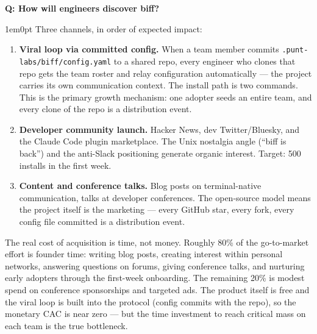 \documentclass[11pt,letterpaper]{article}
\newcounter{faqnum}
\newenvironment{faqpair}[1]{%
  \needspace{4\baselineskip}%
  \vspace{0.5em}%
  \refstepcounter{faqnum}%
  \noindent\textbf{\color{SectionBlue}Q\thefaqnum: #1}\par\nopagebreak[4]%
  \vspace{0.2em}%
  \begin{adjustwidth}{1em}{0pt}%
  \setlength{\parindent}{0pt}%
}{%
  \end{adjustwidth}%
  \vspace{0.5em}%
}
\begin{document}
\begin{faqpair}{How will engineers discover biff?}\label{faq:discovery}
  Three channels, in order of expected impact:

  \begin{enumerate}[leftmargin=1.5em]
    \item \textbf{Viral loop via committed config.} When a team member
    commits \texttt{.punt-labs/biff/config.yaml} to a shared repo, every engineer who
    clones that repo gets the team roster and relay configuration
    automatically --- the project carries its own communication context.
    The install path is two commands. This
    is the primary growth mechanism: one adopter seeds an entire team,
    and every clone of the repo is a distribution event.

    \item \textbf{Developer community launch.} Hacker News, dev
    Twitter/Bluesky, and the Claude Code plugin marketplace. The Unix
    nostalgia angle (``biff is back'') and the anti-Slack positioning
    generate organic interest. Target: 500 installs in the first week.

    \item \textbf{Content and conference talks.} Blog posts on
    terminal-native communication, talks at developer conferences. The
    open-source model means the project itself is the marketing --- every
    GitHub star, every fork, every config file committed is a
    distribution event.
  \end{enumerate}

  The real cost of acquisition is time, not money. Roughly 80\% of the
  go-to-market effort is founder time: writing blog posts, creating
  interest within personal networks, answering questions on forums,
  giving conference talks, and nurturing early adopters through the
  first-week onboarding. The remaining 20\% is modest spend on
  conference sponsorships and targeted ads. The product itself is free
  and the viral loop is built into the protocol (config commits
  with the repo), so the monetary CAC is near zero --- but the time
  investment to reach critical mass on each team is the true bottleneck.
\end{faqpair}
\end{document}
